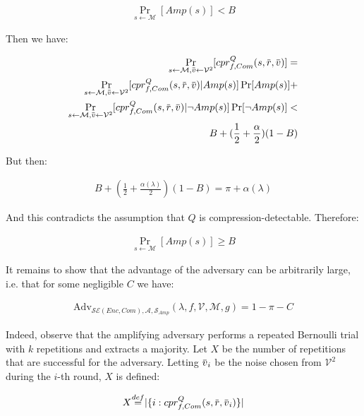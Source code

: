 \documentclass[conference, letterpaper, 10pt]{IEEEtran}
\newcommand\defeq{\stackrel{\mathclap{\normalfont\mbox{def}}}{=}}
\newcommand{\overbar}[1]{\mkern 1.5mu\overline{\mkern-1.5mu#1\mkern-1.5mu}\mkern 1.5mu}
\begin{document}
\begin{IEEEproof}
\begin{align*}
    \Pr_{s \leftarrow \mathcal{M}}
    [Amp(s)] < B
\end{align*}

Then we have:

\begin{align*}
    \Pr_{s \leftarrow \mathcal{M},
         \overbar{v} \leftarrow \mathcal{V}^2}
         [cpr^Q_{f, Com}(s, \overbar{r}, \overbar{v})]
    =\\
    \Pr_{s \leftarrow \mathcal{M},
         \overbar{v} \leftarrow \mathcal{V}^2}
         [cpr^Q_{f, Com}(s, \overbar{r}, \overbar{v})|Amp(s)]\Pr[Amp(s)]
    +\\
    \Pr_{s \leftarrow \mathcal{M},
         \overbar{v} \leftarrow \mathcal{V}^2}
         [cpr^Q_{f, Com}(s, \overbar{r}, \overbar{v})|\lnot Amp(s)]\Pr[\lnot Amp(s)]
    <\\
    B + (\frac{1}{2} + \frac{\alpha}{2})(1 - B)
\end{align*}

But then:

\begin{align*}
    B + (\frac{1}{2} + \frac{\alpha(\lambda)}{2})(1 - B) =
    \pi + \alpha(\lambda)
\end{align*}

And this contradicts the assumption that $Q$ is compression-detectable. Therefore:

\begin{align*}
    \Pr_{s \leftarrow \mathcal{M}}
    [Amp(s)] \geq B
\end{align*}

It remains to show that the advantage of the adversary can be
arbitrarily large, i.e. that for some negligible $C$ we have:

\begin{align*}
    \text{Adv}_{\mathcal{SE}(Enc, Com), \mathcal{A}, \mathcal{S}_{Amp}}
    (\lambda, f, \mathcal{V}, \mathcal{M}, g) = 1 - \pi - C
\end{align*}

Indeed, observe that the amplifying adversary performs a repeated Bernoulli
trial with $k$ repetitions and extracts a majority. Let $X$ be the number of
repetitions that are successful for the adversary. Letting $\overbar{v}_i$
be the noise chosen from $\mathcal{V}^2$ during the $i$-th round, $X$ is defined:

\begin{align*}
    X \defeq |\{ i: cpr^Q_{f, Com}(s, \overbar{r}, \overbar{v}_i) \}|
\end{align*}


\end{IEEEproof}
\end{document}

